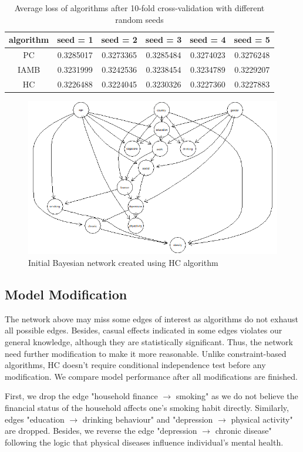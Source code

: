 \documentclass[11pt,twoside]{article}
\numberwithin{Theorem}{section}
\numberwithin{Definition}{section}
\numberwithin{Lemma}{section}
\numberwithin{Algorithm}{section}
\numberwithin{equation}{section}
\begin{document}
\begin{table}[!h]
	\centering
	\begin{tabular}{|c|c|c|c|c|c|}
		\hline
		algorithm & seed = 1 & seed = 2 & seed = 3 & seed = 4 & seed = 5 \\
		\hline
		PC & 0.3285017 & 0.3273365 & 0.3285484 & 0.3274023 &  0.3276248 \\
		IAMB & 0.3231999 & 0.3242536 & 0.3238454 & 0.3234789 & 0.3229207 \\
		HC & 0.3226488 & 0.3224045 & 0.3230326 & 0.3227360 & 0.3227883 \\
		\hline
	\end{tabular}
	\caption{Average loss of algorithms after 10-fold cross-validation with different random seeds}
	\label{tab:bn_cv}
\end{table}

\begin{figure}[!h]
	\centering
	\includegraphics[width = 0.65 \textwidth]{Images/hc.png}
	\caption{Initial Bayesian network created using HC algorithm}
	\label{fig:hc}
\end{figure}

\subsection{Model Modification}

 The network above may miss some edges of interest as algorithms do not exhaust all possible edges. Besides, casual effects indicated in some edges violates our general knowledge, although they are statistically significant. Thus, the network need further modification to make it more reasonable. Unlike constraint-based algorithms, HC doesn't require conditional independence test before any modification. We compare model performance after all modifications are finished.

First, we drop the edge "household finance $\rightarrow$ smoking" as we do not believe the financial status of the household affects one's smoking habit directly. Similarly, edges "education $\rightarrow$ drinking behaviour" and "depression $\rightarrow$ physical activity" are dropped. Besides, we reverse the edge "depression $\rightarrow$ chronic disease" following the logic that physical diseases influence individual's mental health.
\end{document}

